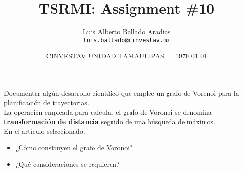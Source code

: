\documentclass{article}
\title{TSRMI: Assignment \#10} %
\author{Luis Alberto Ballado Aradias\\ \texttt{luis.ballado@cinvestav.mx}} %
\date{CINVESTAV UNIDAD TAMAULIPAS --- \today} %
\begin{document}
\maketitle %


Documentar algún desarrollo científico que emplee un grafo de Voronoi para la planificación de trayectorias. \\
La operación empleada para calcular el grafo de Voronoi se denomina \textbf{transformación de distancia} seguido de una búsqueda de máximos.\\

En el artículo seleccionado,

\begin{itemize}
\item ¿Cómo construyen el grafo de Voronoi?
\item ¿Qué consideraciones se requieren?
\end{itemize}
\end{document}
